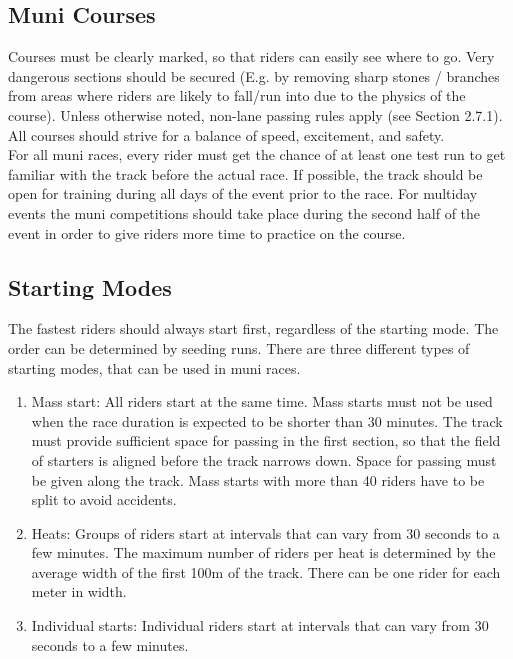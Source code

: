 \subsection{Muni Courses}
Courses must be clearly marked, so that riders can easily see where to go. Very
dangerous sections should be secured (E.g. by removing sharp stones / branches
from areas where riders are likely to fall/run into due to the physics of the
course). Unless otherwise noted, non-lane passing rules apply (see Section
2.7.1). %
All courses should strive for a balance of speed, excitement, and
safety.\\
For all muni races, every rider must get the chance of at least one test run to
get familiar with the track before the actual race. If possible, the track
should be open for training during all days of the event prior to the race. For
multiday events the muni competitions should take place during the second half
of the event in order to give riders more time to practice on the course.

\subsection{Starting Modes}
The fastest riders should always start first, regardless of the starting mode.
The order can be determined by seeding runs. There are three different types of
starting modes, that can be used in muni races.

\begin{enumerate}
\item Mass start: All riders start at the same time. Mass starts must not be
      used when the race duration is expected to be shorter than 30 minutes. The
      track must provide sufficient space for passing in the first section, so
      that the field of starters is aligned before the track narrows down. Space
      for passing must be given along the track. Mass starts with more than 40
      riders have to be split to avoid accidents.
\item Heats: Groups of riders start at intervals that can vary from 30 seconds
      to a few minutes. The maximum number of riders per heat is determined by
      the average width of the first 100m of the track. There can be one rider
      for each meter in width.
\item Individual starts: Individual riders start at intervals that can vary from
      30 seconds to a few minutes.
\end{enumerate}


